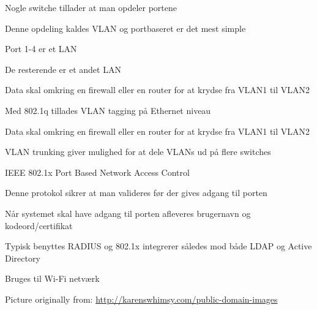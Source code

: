 \documentclass[Screen16to9,17pt]{foils}
\begin{document}


\begin{list1}
\item Nogle switche tillader at man opdeler portene
\item Denne opdeling kaldes VLAN og portbaseret er det mest simple
\item Port 1-4 er et LAN
\item De resterende er et andet LAN
\item Data skal omkring en firewall eller en router for at krydse fra VLAN1 til VLAN2
\end{list1}



\begin{list1}
\item Med 802.1q tillades VLAN tagging på Ethernet niveau
\item Data skal omkring en firewall eller en router for at krydse fra VLAN1 til VLAN2
\item VLAN trunking giver mulighed for at dele VLANs ud på flere switches
\end{list1}



IEEE 802.1x  Port Based Network Access Control


\begin{list1}
\item Denne protokol sikrer at man valideres før der gives adgang til porten
\item Når systemet skal have adgang til porten afleveres brugernavn og kodeord/certifikat
\item Typisk benyttes RADIUS og 802.1x integrerer således mod både LDAP og Active Directory
\item Bruges til Wi-Fi netværk
\end{list1}




\centerline{Picture originally from: \url{http://karenswhimsy.com/public-domain-images}}

\end{document}
